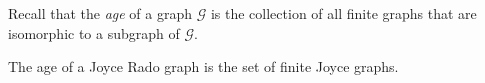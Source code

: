 Recall that the \emph{age} of a graph $\mathcal{G}$ is the collection of all finite graphs that are isomorphic to a subgraph of $\mathcal{G}$.

\begin{corollary}
  The age of a Joyce Rado graph is the set of finite Joyce graphs.
\end{corollary}

%
%
%
